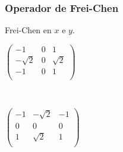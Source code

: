\subsubsection{Operador de Frei-Chen}

Frei-Chen en $x$ e $y$.

\begin{center}
\begin{minipage}{0.30 \textwidth}
$\begin{pmatrix}
-1 & 0 & 1 \\
-\sqrt{2} & 0 & \sqrt{2} \\
-1 & 0 & 1 \\
\end{pmatrix}$
\end{minipage}
\ \ 
 \begin{minipage}{0.30 \textwidth}
$\begin{pmatrix}
-1 & -\sqrt{2} & -1 \\
0 & 0 & 0  \\
1 & \sqrt{2} & 1 \\
\end{pmatrix}$
\end{minipage}
\end{center}